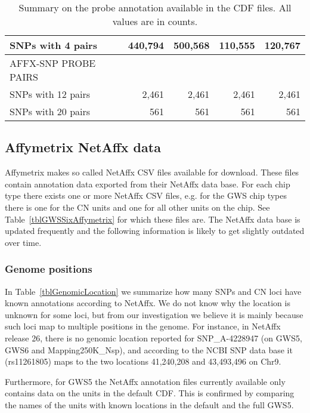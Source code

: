 \documentclass[10pt,a4paper]{article}
\begin{document}
\begin{table}[htp]
\begin{center}
\begin{tabular}{|l|rr||rr|}
SNPs with 4 pairs       &  440,794  &  500,568  &    110,555 &   120,767 \\
\hline
AFFX-SNP PROBE PAIRS     &	         &	  			 &	 				  &	 		      \\
SNPs with 12 pairs       &    2,461  &    2,461  &     2,461  &     2,461 \\
SNPs with 20 pairs       &      561  &      561  &       561  &       561 \\
\hline
\end{tabular}
\end{center}
\caption{Summary on the probe annotation available in the CDF files.  All values are in counts.}    %
\label{tblCdfProbes}
\end{table}



\subsection{Affymetrix NetAffx data}

Affymetrix makes so called NetAffx CSV files available for download.  These files contain annotation data exported from their NetAffx data base.  For each chip type there exists one or more NetAffx CSV files, e.g. for the GWS chip types there is one for the CN units and one for all other units on the chip.  See Table~\ref{tblGWSSixAffymetrix} for which these files are.
The NetAffx data base is updated frequently and the following information is likely to get slightly outdated over time. 

\subsubsection{Genome positions}
In Table~\ref{tblGenomicLocation} we summarize how many SNPs and CN loci have known annotations according to NetAffx.  
We do not know why the location is unknown for some loci, but from our investigation we believe it is mainly because such loci map to multiple positions in the genome.  For instance, in NetAffx release 26, there is no genomic location reported for SNP\_A-4228947 (on GWS5, GWS6 and Mapping250K\_Nsp), and according to the NCBI SNP data base it (rs11261805) maps to the two locations 41,240,208 and 43,493,496 on Chr9.

Furthermore, for GWS5 the NetAffx annotation files currently available only contains data on the units in the default CDF.  This is confirmed by comparing the names of the units with known locations in the default and the full GWS5.
\end{document}

